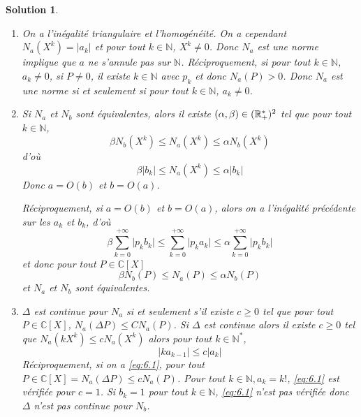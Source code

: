 \documentclass[12pt]{article}
\newtheorem{solution}{Solution}[section]
\theoremstyle{remark}
\newcommand{\C}{\mathbb{C}} \newcommand{\Q}{\mathbb{Q}}
\newcommand{\N}{\mathbb{N}} \newcommand{\Z}{\mathbb{Z}}
\numberwithin{equation}{section}
\begin{document}
\begin{solution}
	\phantom{}
	\begin{enumerate}
		\item On a l'inégalité triangulaire et l'homogénéité. On a cependant $N_{a}(X^{k})=\vert a_{k}\vert$ et pour tout $k\in\N$, $X^{k}\neq0$. Donc $N_{a}$ est une norme implique que $a$ ne s'annule pas sur $\N$. Réciproquement, si pour tout $k\in\N$, $a_{k}\neq0$, si $P\neq0$, il existe $k\in\N$ avec $p_{k}$ et donc $N_{a}(P)>0$. Donc $N_{a}$ est une norme si et seulement si pour tout $k\in\N$, $a_{k}\neq0$.
		
		\item Si $N_{a}$ et $N_{b}$ sont équivalentes, alors il existe $(\alpha,\beta)\in(\mathbb{R}_{+}^{*})^{2}$ tel que pour tout $k\in\N$,
		$$\beta N_{b}(X^{k})\leqslant N_{a}(X^{k})\leqslant\alpha N_{b}(X^{k})$$
		d'où
		$$\beta \vert b_{k}\vert\leqslant N_{a}(X^{k})\leqslant\alpha \vert b_{k}\vert$$
		Donc $a=O(b)$ et $b=O(a)$.

		Réciproquement, si $a=O(b)$ et $b=O(a)$, alors on a l'inégalité précédente sur les $a_{k}$ et $b_{k}$, d'où
		$$\beta\sum_{k=0}^{+\infty}\vert p_{k}b_{k}\vert\leqslant\sum_{k=0}^{+\infty}\vert p_{k}a_{k}\vert\leqslant\alpha\sum_{k=0}^{+\infty}\vert p_{k} b_{k}\vert$$
		et donc pour tout $P\in\C[X]$
		$$\beta N_{b}(P)\leqslant N_{a}(P)\leqslant\alpha N_{b}(P)$$
		et $N_{a}$ et $N_{b}$ sont équivalentes.

		\item $\Delta$ est continue pour $N_{a}$ si et seulement s'il existe $c\geqslant0$ tel que pour tout $P\in\C[X]$, $N_{a}(\Delta P)\leqslant CN_{a}(P)$. Si $\Delta$ est continue alors il existe $c\geqslant0$ tel que $N_{a}(kX^{k})\leqslant cN_{a}(X^{k})$ alors pour tout $k\in\N^{*}$,
		\begin{equation}
			\label{eq:6.1}
			\vert ka_{k-1}\vert\leqslant c\vert a_{k}\vert
		\end{equation}
		Réciproquement, si on a \eqref{eq:6.1}, pour tout $P\in\C[X]=N_{a}(\Delta P)\leqslant cN_{a}(P)$. Pour tout $k\in\N,a_{k}=k!$, \eqref{eq:6.1} est vérifiée pour $c=1$. Si $b_{k}=1$ pour tout $k\in\N$, \eqref{eq:6.1} n'est pas vérifiée donc $\Delta$ n'est pas continue pour $N_{b}$.
	\end{enumerate}
\end{solution}
\end{document}
